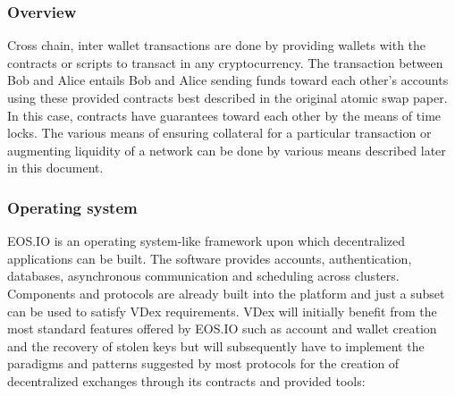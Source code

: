 \documentclass[]{article}
\begin{document}
	\subsubsection{Overview}
	Cross chain, inter wallet transactions are done by providing wallets with the contracts or scripts to transact in any cryptocurrency. 
	The transaction between Bob and Alice entails Bob and Alice sending funds toward each other's accounts 
	using these provided contracts best described in the original atomic swap paper.\cite{22} 
	In this case, contracts have guarantees toward each other by the means of time locks. 
	The various means of ensuring collateral for a particular transaction or augmenting liquidity of a network 
	can be done by various means described later in this document.
	
	\subsubsection{Operating system}
	EOS.IO is an operating system-like framework upon which decentralized applications can be built. 
	The software provides accounts, authentication, databases, asynchronous communication and scheduling across clusters. 
	Components and protocols are already built into the platform and just a subset can be used to satisfy VDex requirements. 
	VDex will initially benefit from the most standard features offered by EOS.IO such as account and wallet creation 
	and the recovery of stolen keys but will subsequently have to implement the paradigms and patterns suggested by most protocols 
	for the creation of decentralized exchanges through its contracts and provided tools:	\cite{3}\\
  
\end{document}
